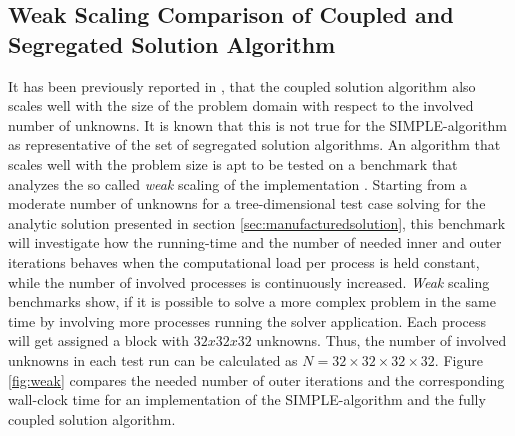 \subsection{Weak Scaling Comparison of Coupled and Segregated Solution Algorithm}
\label{sec:weakscaling}

It has been previously reported in \cite{darwish09,vakilipour12}, that the coupled solution algorithm also scales well with the size of the problem domain with respect to the involved number of unknowns. It is known that this is not true for the SIMPLE-algorithm as representative of the set of segregated solution algorithms. An algorithm that scales well with the problem size is apt to be tested on a benchmark that analyzes the so called \emph{weak} scaling of the implementation \cite{hager11}. Starting from a moderate number of unknowns for a tree-dimensional test case solving for the analytic solution presented in section \ref{sec:manufacturedsolution}, this benchmark will investigate how the running-time and the number of needed inner and outer iterations behaves when the computational load per process is held constant, while the number of involved processes is continuously increased. \emph{Weak} scaling benchmarks show, if it is possible to solve a more complex problem in the same time by involving more processes running the solver application. Each process will get assigned a block with \(32x32x32\) unknowns. Thus, the number of involved unknowns in each test run can be calculated as \( N = 32\times32\times32\times32 \). Figure \ref{fig:weak} compares the needed number of outer iterations and the corresponding wall-clock time for an implementation of the SIMPLE-algorithm and the fully coupled solution algorithm.

